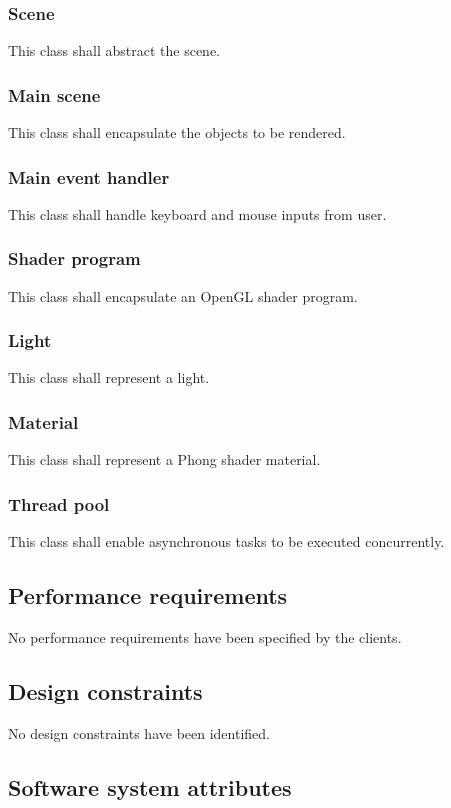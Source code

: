 \documentclass[12pt]{article}
\begin{document}
	\subsubsection{Scene}
	This class shall abstract the scene.
	
	\subsubsection{Main scene}
	This class shall encapsulate the objects to be rendered.
	
	\subsubsection{Main event handler}
	This class shall handle keyboard and mouse inputs from user.
	
	\subsubsection{Shader program}
	This class shall encapsulate an OpenGL shader program.
	
	\subsubsection{Light}
	This class shall represent a light.
	
	\subsubsection{Material}
	This class shall represent a Phong shader material.
	
	\subsubsection{Thread pool}
	This class shall enable asynchronous tasks to be executed concurrently.
	
	\subsection{Performance requirements}
	No performance requirements have been specified by the clients.
	
	\subsection{Design constraints}
	No design constraints have been identified.
	
	\subsection{Software system attributes}
\end{document}
